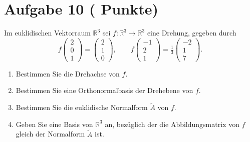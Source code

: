 \documentclass[11pt, a4paper]{article}
\newcommand{\aufgabe}[2]{%
  \section*{\Large\bfseries Aufgabe #1%
  \if\relax\detokenize{#2}\relax\else \hfill\normalfont\normalsize(#2 Punkte)\fi}%
  \vspace{-1.5ex}
}
\begin{document}
\aufgabe{10}{}
Im euklidischen Vektorraum $\mathbb{R}^3$ sei $f:\mathbb{R}^3\to\mathbb{R}^3$ eine Drehung, gegeben durch
\[
f\!\begin{pmatrix}2\\0\\1\end{pmatrix}=\begin{pmatrix}2\\1\\0\end{pmatrix},\qquad
f\!\begin{pmatrix}-1\\2\\1\end{pmatrix}=\tfrac{1}{3}\begin{pmatrix}-2\\1\\7\end{pmatrix}.
\]
\begin{enumerate}
  \item Bestimmen Sie die Drehachse von $f$.
  \begin{framed}\end{framed}
  \item Bestimmen Sie eine Orthonormalbasis der Drehebene von $f$.
  \begin{framed}\end{framed}
  \item Bestimmen Sie die euklidische Normalform $\tilde A$ von $f$.
  \begin{framed}\end{framed}
  \item Geben Sie eine Basis von $\mathbb{R}^3$ an, bezüglich der die Abbildungsmatrix von $f$ gleich der Normalform $\tilde A$ ist.
  \begin{framed}\end{framed}
\end{enumerate}
\end{document}
